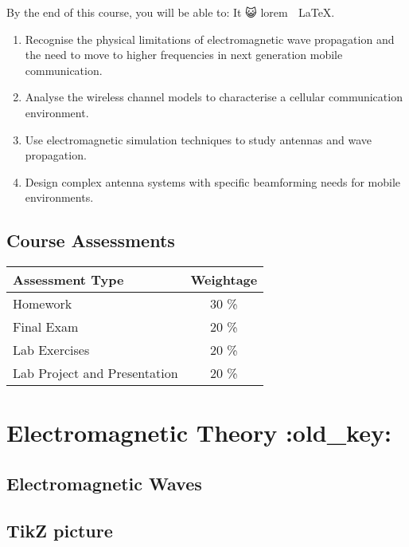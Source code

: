 \documentclass[
]{article}
\providecommand{\tightlist}{%
  \setlength{\itemsep}{0pt}\setlength{\parskip}{0pt}}
\begin{document}
By the end of this course, you will be able to: It 😺 lorem 👅 \LaTeX.

\begin{enumerate}
\def\labelenumi{\arabic{enumi}.}
\tightlist
\item
  Recognise the physical limitations of electromagnetic wave propagation
  and the need to move to higher frequencies in next generation mobile
  communication.
\item
  Analyse the wireless channel models to characterise a cellular
  communication environment.
\item
  Use electromagnetic simulation techniques to study antennas and wave
  propagation.
\item
  Design complex antenna systems with specific beamforming needs for
  mobile environments.
\end{enumerate}

\hypertarget{course-assessments}{%
\subsection{Course Assessments}\label{course-assessments}}

\begin{longtable}[]{@{}lc@{}}
\toprule
Assessment Type & Weightage \\
\midrule
\endhead
Homework & 30 \% \\
Final Exam & 20 \% \\
Lab Exercises & 20 \% \\
Lab Project and Presentation & 20 \% \\
\bottomrule
\end{longtable}

\hypertarget{electromagnetic-theory-old_key}{%
\section{Electromagnetic Theory
:old\_key:}\label{electromagnetic-theory-old_key}}

\hypertarget{electromagnetic-waves}{%
\subsection{Electromagnetic Waves}\label{electromagnetic-waves}}

\hypertarget{tikz-picture}{%
\subsection{TikZ picture}\label{tikz-picture}}
\end{document}
